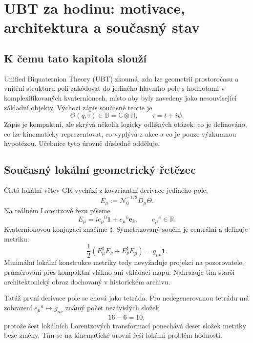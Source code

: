 
\chapter{UBT za hodinu: motivace, architektura a současný stav}
\label{ch:overview}

\section{K čemu tato kapitola slouží}
Unified Biquaternion Theory (UBT) zkoumá, zda lze geometrii prostoročasu a
vnitřní strukturu polí zakódovat do jediného hlavního pole s hodnotami v
komplexifikovaných kvaternionech, místo aby byly zavedeny jako nesouvisející
základní objekty. Výchozí zápis současné teorie je
\[
 \Theta(q,\tau)\in\mathbb B=\mathbb C\otimes\mathbb H,
 \qquad \tau=t+i\psi .
\]
Zápis je kompaktní, ale skrývá několik logicky odlišných otázek:
co je definováno, co lze kinematicky reprezentovat, co vyplývá z akce a co je
pouze výzkumnou hypotézou. Učebnice tyto úrovně důsledně odděluje.

\section{Současný lokální geometrický řetězec}
Čistá lokální větev GR vychází z kovariantní derivace jediného pole,
\[
 E_\mu:=\mathcal N_0^{-1/2}D_\mu\Theta .
\]
Na reálném Lorentzově řezu píšeme
\[
 E_\mu=i e_\mu{}^0\mathbf1+e_\mu{}^k\mathbf e_k,
 \qquad e_\mu{}^a\in\mathbb R.
\]
Kvaternionovou konjugaci značíme $\sharp$. Symetrizovaný součin je centrální
a definuje metriku:
\[
 \boxed{
 \frac12\left(E_\mu^\sharp E_\nu+E_\nu^\sharp E_\mu\right)
 =g_{\mu\nu}\mathbf1 .}
\]
Minimální lokální konstrukce metriky tedy nevyžaduje projekci na pozorovatele,
průměrování přes kompaktní vlákno ani vkládací mapu. Nahrazuje tím starší
architektonický obraz dochovaný v historickém archivu.

Tatáž první derivace pole se chová jako tetráda. Pro nedegenerovanou tetrádu
má zobrazení $e_\mu{}^a\mapsto g_{\mu\nu}$ známý počet nezávislých složek
\[
 16-6=10,
\]
protože šest lokálních Lorentzových transformací ponechává deset složek
metriky beze změny. Tím se na kinematické úrovni řeší lokální problém hodnosti.

